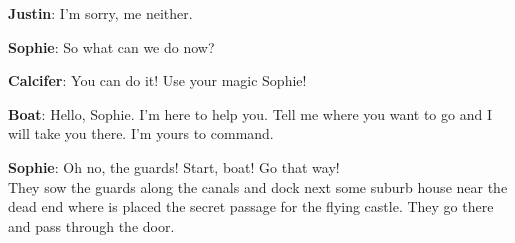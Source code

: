 \textbf{Justin}: I’m sorry, me neither.

\textbf{Sophie}: So what can we do now?

\textbf{Calcifer}: You can do it! Use your magic Sophie!

\textbf{Boat}: Hello, Sophie. I’m here to help you. Tell me where you want to go and I will take you there. I’m yours to command.

\textbf{Sophie}: Oh no, the guards! Start, boat! Go that way!\\

\noindent They sow the guards along the canals and dock next some suburb house near the dead end where is placed the secret passage for the flying castle. They go there and pass through the door.
